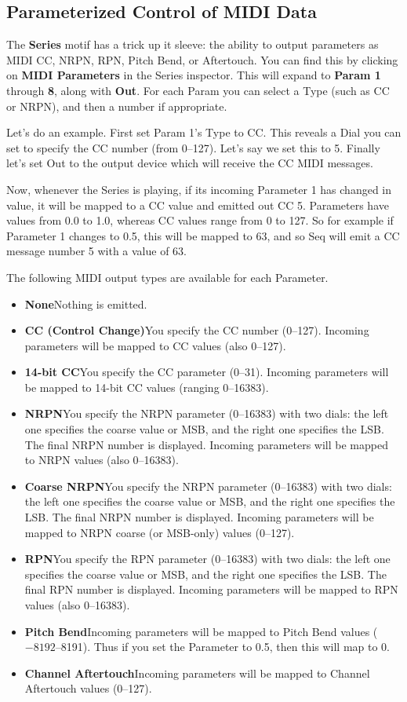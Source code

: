 \documentclass[twoside,10pt]{article}
\begin{document}
\subsection{Parameterized Control of MIDI Data}
\label{mididata}

The {\bf Series} motif has a trick up it sleeve: the ability to output parameters as MIDI CC, NRPN, RPN, Pitch Bend, or Aftertouch. You can find this by clicking on {\bf MIDI Parameters} in the Series inspector.  This will expand to {\bf Param 1} through {\bf 8}, along with {\bf Out}.  For each Param you can select a Type (such as CC or NRPN), and then a number if appropriate.  

Let's do an example.  First set Param 1's Type to CC.  This reveals a Dial you can set to specify the CC number (from 0--127).  Let's say we set this to 5.  Finally let's set Out to the output device which will receive the CC MIDI messages.

Now, whenever the Series is playing, if its incoming Parameter 1 has changed in value, it will be mapped to a CC value and emitted out CC 5.  Parameters have values from 0.0 to 1.0, whereas CC values range from 0 to 127.  So for example if Parameter 1 changes to 0.5, this will be mapped to 63, and so Seq will emit a CC message number 5 with a value of 63.

The following MIDI output types are available for each Parameter.

\begin{itemize} 
\item {\bf None}\quad Nothing is emitted.
\item {\bf CC (Control Change)}\quad You specify the CC number (0--127).  Incoming parameters will be mapped to CC values (also 0--127).
\item {\bf 14-bit CC}\quad You specify the CC parameter (0--31).  Incoming parameters will be mapped to 14-bit CC values (ranging 0--16383).
\item {\bf NRPN}\quad You specify the NRPN parameter (0--16383) with two dials: the left one specifies the coarse value or MSB, and the right one specifies the LSB.  The final NRPN number is displayed.  Incoming parameters will be mapped to NRPN values (also 0--16383).
\item {\bf Coarse NRPN}\quad You specify the NRPN parameter (0--16383) with two dials: the left one specifies the coarse value or MSB, and the right one specifies the LSB.  The final NRPN number is displayed.  Incoming parameters will be mapped to NRPN coarse (or MSB-only) values (0--127).
\item {\bf RPN}\quad You specify the RPN parameter (0--16383) with two dials: the left one specifies the coarse value or MSB, and the right one specifies the LSB.  The final RPN number is displayed.  Incoming parameters will be mapped to RPN values (also 0--16383).
\item {\bf Pitch Bend}\quad Incoming parameters will be mapped to Pitch Bend values (\(-8192\)--8191).  Thus if you set the Parameter to 0.5, then this will map to 0.
\item {\bf Channel Aftertouch}\quad Incoming parameters will be mapped to Channel Aftertouch values (0--127).
\end{itemize}
\end{document}
